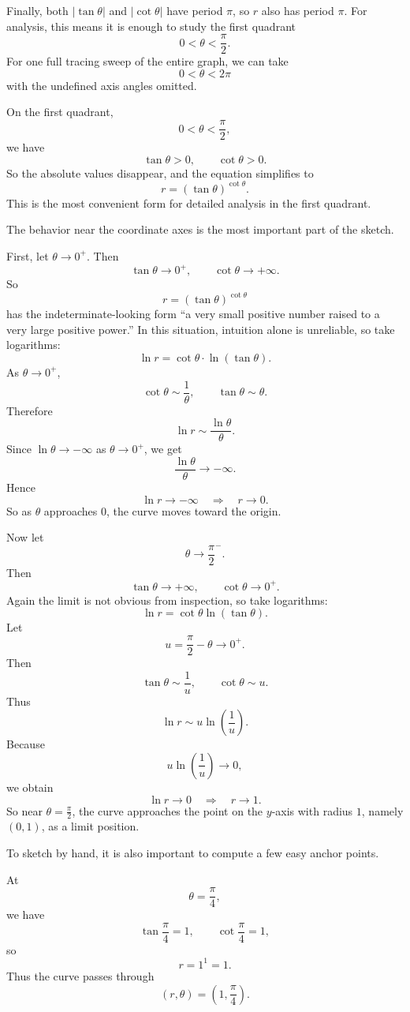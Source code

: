 \documentclass[a4paper,12pt,twocolumn]{article}
\newenvironment{solutionbox}{\begin{framed}}{\end{framed}}
\begin{document}
\begin{solutionbox}
\begin{steps}
Finally, both \(\lvert\tan\theta\rvert\) and \(\lvert\cot\theta\rvert\) have period \(\pi\), so \(r\) also has period \(\pi\). For analysis, this means it is enough to study the first quadrant
\[
0<\theta<\frac{\pi}{2}.
\]
For one full tracing sweep of the entire graph, we can take
\[
0<\theta<2\pi
\]
with the undefined axis angles omitted.

\item On the first quadrant,
\[
0<\theta<\frac{\pi}{2},
\]
we have
\[
\tan\theta>0,\qquad \cot\theta>0.
\]
So the absolute values disappear, and the equation simplifies to
\[
r=(\tan\theta)^{\cot\theta}.
\]
This is the most convenient form for detailed analysis in the first quadrant.

\item The behavior near the coordinate axes is the most important part of the sketch.

First, let \(\theta\to 0^+\). Then
\[
\tan\theta\to 0^+,\qquad \cot\theta\to +\infty.
\]
So
\[
r=(\tan\theta)^{\cot\theta}
\]
has the indeterminate-looking form ``a very small positive number raised to a very large positive power.'' In this situation, intuition alone is unreliable, so take logarithms:
\[
\ln r=\cot\theta\cdot \ln(\tan\theta).
\]
As \(\theta\to 0^+\),
\[
\cot\theta\sim \frac{1}{\theta},
\qquad
\tan\theta\sim \theta.
\]
Therefore
\[
\ln r\sim \frac{\ln\theta}{\theta}.
\]
Since \(\ln\theta\to -\infty\) as \(\theta\to 0^+\), we get
\[
\frac{\ln\theta}{\theta}\to -\infty.
\]
Hence
\[
\ln r\to -\infty
\quad\Longrightarrow\quad
r\to 0.
\]
So as \(\theta\) approaches \(0\), the curve moves toward the origin.

\item Now let
\[
\theta\to \frac{\pi}{2}^{-}.
\]
Then
\[
\tan\theta\to +\infty,\qquad \cot\theta\to 0^+.
\]
Again the limit is not obvious from inspection, so take logarithms:
\[
\ln r=\cot\theta\ln(\tan\theta).
\]
Let
\[
u=\frac{\pi}{2}-\theta\to 0^+.
\]
Then
\[
\tan\theta\sim \frac{1}{u},
\qquad
\cot\theta\sim u.
\]
Thus
\[
\ln r\sim u\ln\!\left(\frac{1}{u}\right).
\]
Because
\[
u\ln\!\left(\frac{1}{u}\right)\to 0,
\]
we obtain
\[
\ln r\to 0
\quad\Longrightarrow\quad
r\to 1.
\]
So near \(\theta=\frac{\pi}{2}\), the curve approaches the point on the \(y\)-axis with radius \(1\), namely \((0,1)\), as a limit position.

\item To sketch by hand, it is also important to compute a few easy anchor points.

At
\[
\theta=\frac{\pi}{4},
\]
we have
\[
\tan\frac{\pi}{4}=1,\qquad \cot\frac{\pi}{4}=1,
\]
so
\[
r=1^1=1.
\]
Thus the curve passes through
\[
\left(r,\theta\right)=\left(1,\frac{\pi}{4}\right).
\]


\end{steps}
\end{solutionbox}
\end{document}
